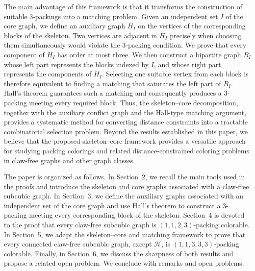 \documentclass[12pt, oneside]{scrartcl}
\begin{document}
The main advantage of this framework is that it transforms the construction of suitable $3$-packings into a matching problem. Given an independent set $I$ of the core graph, we define an auxiliary graph $H_I$ on the vertices of the corresponding blocks of the skeleton. Two vertices are adjacent in $H_I$ precisely when choosing them simultaneously would violate the $3$-packing condition. We prove that every component of $H_I$ has order at most three. We then construct a bipartite graph $B_I$ whose left part represents the blocks indexed by $I$, and whose right part represents the components of $H_I$. Selecting one suitable vertex from each block is therefore equivalent to finding a matching that saturates the left part of $B_I$. Hall's theorem guarantees such a matching and consequently produces a $3$-packing meeting every required block. Thus, the skeleton--core decomposition, together with the auxiliary conflict graph and the Hall-type matching argument, provides a systematic method for converting distance constraints into a tractable combinatorial selection problem.
Beyond the results established in this paper, we believe that the proposed skeleton--core framework provides a versatile approach for studying packing colorings and related distance-constrained coloring problems in claw-free graphs and other graph classes.

The paper is organized as follows. In Section~2, we recall the main tools used in the proofs and introduce the skeleton and core graphs associated with a claw-free subcubic graph. In Section~3, we define the auxiliary graphs associated with an independent set of the core graph and use Hall's theorem to construct a $3$-packing meeting every corresponding block of the skeleton. Section~4 is devoted to the proof that every claw-free subcubic graph is $(1,1,2,3)$-packing colorable. In Section~5, we adapt the skeleton--core and matching framework to prove that every connected claw-free subcubic graph, except $\mathcal{H}$, is $(1,1,3,3,3)$-packing colorable. Finally, in Section~6, we discuss the sharpness of both results and propose a related open problem. We conclude with remarks and open problems.
\end{document}
